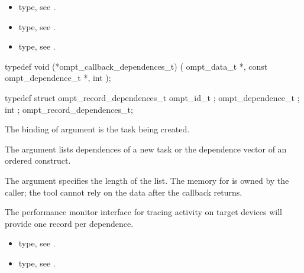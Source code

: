 \crossreferences
\begin{itemize}
\item {} type, see
.
\item {} type, see
.
\item {} type, see
.
\end{itemize}



\label{sec:ompt_callback_dependences_t}
\label{sec:ompt_callback_task_dependences_t}
\format

\begin{ccppspecific}
\begin{omptCallback}
typedef void (*ompt_callback_dependences_t) (
  ompt_data_t *,
  const ompt_dependence_t *,
  int 
);
\end{omptCallback}
\end{ccppspecific}


\record

\begin{ccppspecific}
\begin{omptRecord}
typedef struct ompt_record_dependences_t {
  ompt_id_t ;
  ompt_dependence_t ;
  int ;
} ompt_record_dependences_t;
\end{omptRecord}
\end{ccppspecific}



\argdesc

The binding of argument  is the task being created.

The argument  lists dependences of a new task or the dependence vector of an 
ordered construct.

The argument  specifies the length of the list.
The memory for  is owned by the caller; the tool cannot rely on
the data after the callback returns.

The performance monitor interface for tracing activity on target devices will provide one record per dependence.

\crossreferences
\begin{itemize}
\item {} type, see
.
\item {} type, see
.
\end{itemize}



